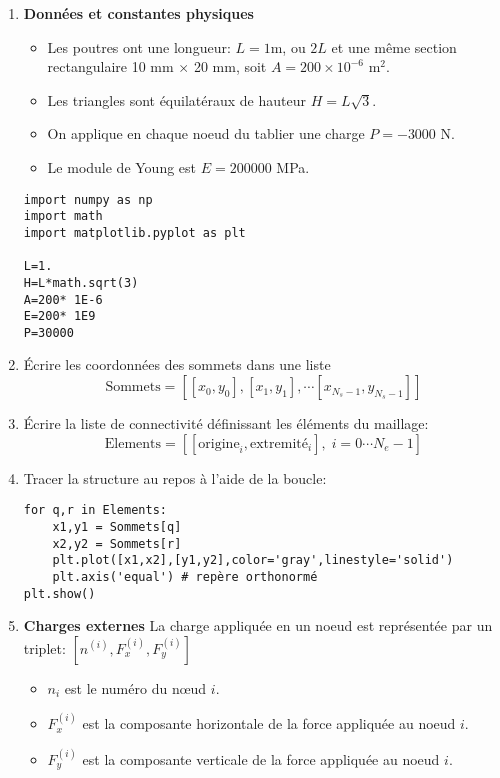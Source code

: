 \documentclass[11pt]{article}
\begin{document}
% 
\begin{enumerate}
\item {\bf Données et constantes physiques}
\begin{itemize}
\item
  Les poutres ont une longueur: \(L=1\)m, ou $2L$ et une même section
  rectangulaire 10 mm \(\times\) 20 mm, soit
  \(A=200\times 10^{-6}\mbox{ m}^2\).
  \item Les triangles sont équilatéraux de hauteur $H=L\sqrt 3$.
\item
  On applique en chaque noeud du tablier une charge \(P=-3000\) N.
\item
  Le module de Young est \(E=200000\) MPa.
\end{itemize}

\begin{verbatim}
import numpy as np
import math
import matplotlib.pyplot as plt

L=1.
H=L*math.sqrt(3)
A=200* 1E-6
E=200* 1E9
P=30000
\end{verbatim}

\item Écrire les coordonnées des sommets dans une liste 
\[ \mbox{Sommets} = \left[[x_0,y_0],[x_1,y_1],\cdots [x_{N_s-1},y_{N_s-1}]\right]\]
\item Écrire la liste de connectivité définissant les éléments du maillage:
\[ \mbox{Elements} = \left[[\mbox{origine}_i,\mbox{extremité}_i], \; i = 0 \cdots N_e-1\right]\]
\item Tracer la structure au repos à l'aide de la boucle:
\begin{verbatim}
for q,r in Elements:
    x1,y1 = Sommets[q]
    x2,y2 = Sommets[r]
    plt.plot([x1,x2],[y1,y2],color='gray',linestyle='solid')
    plt.axis('equal') # repère orthonormé
plt.show()
\end{verbatim}
\item {\bf Charges externes}
La charge appliquée en un noeud est représentée par un triplet:
\([n^{(i)},F^{(i)}_x,F^{(i)}_y]\) 
\begin{itemize}
\item  \(n_i\) est le numéro du nœud
\(i\). 
\item  \(F^{(i)}_x\) est la composante horizontale de la force
appliquée au noeud \(i\). 
\item \(F^{(i)}_y\) est la composante verticale de
la force appliquée au noeud \(i\).
\end{itemize}


\end{enumerate}
\end{document}
